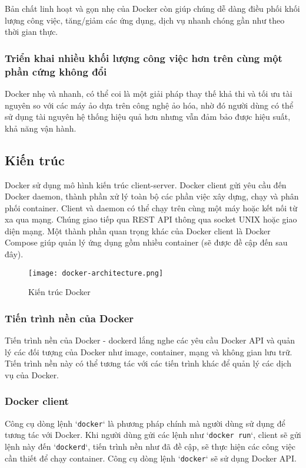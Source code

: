 Bản chất linh hoạt và gọn nhẹ của Docker còn giúp chúng dễ dàng điều phối khối lượng công việc, tăng/giảm các ứng dụng, dịch vụ nhanh chóng gần như theo thời gian thực.

\subsubsection{Triển khai nhiều khối lượng công việc hơn trên cùng một phần cứng không đổi}

Docker nhẹ và nhanh, có thể coi là một giải pháp thay thế khả thi và tối ưu tài nguyên so với các máy ảo dựa trên công nghệ ảo hóa, nhờ đó người dùng có thể sử dụng tài nguyên hệ thống hiệu quả hơn nhưng vẫn đảm bảo được hiệu suất, khả năng vận hành.

\subsection{Kiến trúc}
Docker sử dụng mô hình kiến trúc client-server. Docker client gửi yêu cầu đến Docker daemon, thành phần xử lý toàn bộ các phần việc xây dựng, chạy và phân phối container. Client và daemon có thể chạy trên cùng một máy hoặc kết nối từ xa qua mạng. Chúng giao tiếp qua REST API thông qua socket UNIX hoặc giao diện mạng. Một thành phần quan trọng khác của Docker client là Docker Compose giúp quản lý ứng dụng gồm nhiều container (sẽ được đề cập đến sau đây).

\begin{figure}[htbp]
    \centering
    \texttt{[image: docker-architecture.png]}
    \caption{Kiến trúc Docker}
\end{figure}


\subsubsection{Tiến trình nền của Docker}

Tiến trình nền của Docker - dockerd lắng nghe các yêu cầu Docker API và quản lý các đối tượng của Docker như image, container, mạng và không gian lưu trữ. Tiến trình nền này có thể tương tác với các tiến trình khác để quản lý các dịch vụ của Docker.

\subsubsection{Docker client}

Công cụ dòng lệnh `\texttt{docker}` là phương pháp chính mà người dùng sử dụng để tương tác với Docker. Khi người dùng gửi các lệnh như `\texttt{docker run}`, client sẽ gửi lệnh này đến `\texttt{dockerd}`, tiến trình nền như đã đề cập, sẽ thực hiện các công việc cần thiết để chạy container. Công cụ dòng lệnh `\texttt{docker}` sẽ sử dụng Docker API.

